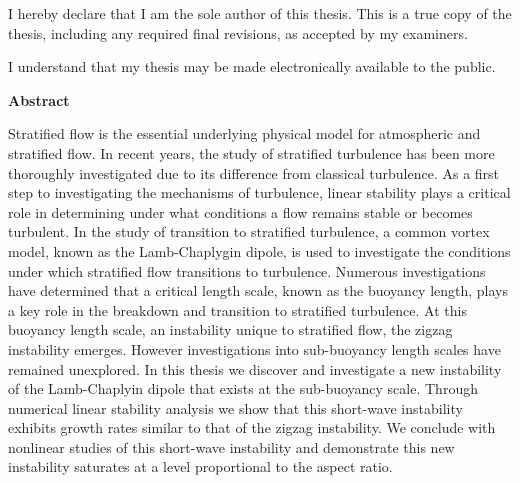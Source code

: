 \cleardoublepage %
 


  \noindent
I hereby declare that I am the sole author of this thesis. This is a true copy of the thesis, including any required final revisions, as accepted by my examiners.

  \bigskip
  
  \noindent
I understand that my thesis may be made electronically available to the public.

\cleardoublepage


\begin{center}\textbf{Abstract}\end{center}
Stratified flow is the essential underlying physical model for atmospheric and stratified flow. In recent years, the study of stratified turbulence has been more thoroughly investigated due to its difference from classical turbulence. As a first step to investigating the mechanisms of turbulence, linear stability plays a critical role in determining under what conditions a flow remains stable or becomes turbulent. In the study of transition to stratified turbulence, a common vortex model, known as the Lamb-Chaplygin dipole, is used to investigate the conditions under which stratified flow transitions to turbulence. Numerous investigations have determined that a critical length scale, known as the buoyancy length, plays a key role in the breakdown and transition to stratified turbulence. At this buoyancy length scale, an instability unique to stratified flow, the zigzag instability emerges. However investigations into sub-buoyancy length scales have remained unexplored. In this thesis we discover and investigate a new instability of the Lamb-Chaplyin dipole that exists at the sub-buoyancy scale. Through numerical linear stability analysis we show that this short-wave instability exhibits growth rates similar to that of the zigzag instability. We conclude with nonlinear studies of this short-wave instability and demonstrate this new instability saturates at a level proportional to the aspect ratio. 
\cleardoublepage

